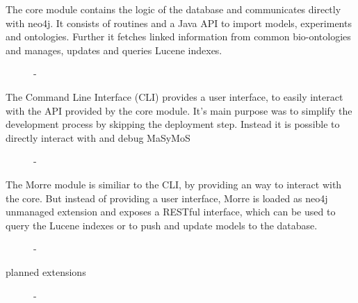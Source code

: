 \begin{description}
\begin{description}
\begin{description}
\begin{description}
\begin{description}
          \item[The core module contains the logic of the database and communicates directly with neo4j. It consists of routines and a Java API to import models, experiments and ontologies. Further it fetches linked information from common bio-ontologies and manages, updates and queries Lucene indexes.] - 
          \item[The Command Line Interface (CLI) provides a user interface, to easily interact with the API provided by the core module. It's main purpose was to simplify the development process by skipping the deployment step. Instead it is possible to directly interact with and debug MaSyMoS] - 
          \item[The Morre module is similiar to the CLI, by providing an way to interact with the core. But instead of providing a user interface, Morre is loaded as neo4j unmanaged extension and exposes a RESTful interface, which can be used to query the Lucene indexes or to push and update models to the database.] - 
          \item[planned extensions] - 
        \end{description} %
      \end{description} %
    \end{description} %
  \end{description} %
\end{description} %

